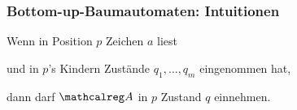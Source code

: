     \begin{frame}
      \frametitle{Bottom-up-Baumautomaten: Intuitionen}
      
      
        \begin{Itemize}
          \item
            Wenn  in Position $p$ Zeichen $a$ liest
          \item
            und in $p$'s Kindern Zustände $q_1,\dots,q_m$ eingenommen hat,
        \end{Itemize}
        dann darf $\Aut{A}$ in $p$ Zustand $q$ einnehmen.
        \Tafel


\end{frame}
